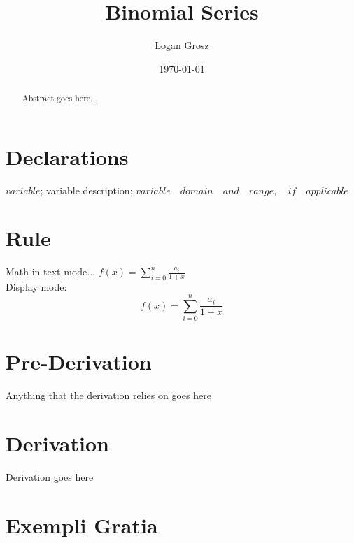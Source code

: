 \documentclass{article}
\begin{document}
	
\author{Logan Grosz}
\title{Binomial Series}
\date{\today}

\maketitle

\begin{abstract}
	Abstract goes here...
\end{abstract}

\section{Declarations}

$variable$; variable description; $variable\quad domain\quad and\quad range,\quad if\quad applicable$

\section{Rule}

Math in text mode... \( f(x) = \sum_{i=0}^{n} \frac{a_i}{1+x} \)\\

Display mode: \\
\[ f(x) = \sum_{i=0}^{n} \frac{a_i}{1+x} \]

\section{Pre-Derivation}
Anything that the derivation relies on goes here

\section{Derivation}

Derivation goes here

\section{Exempli Gratia}
\end{document}
